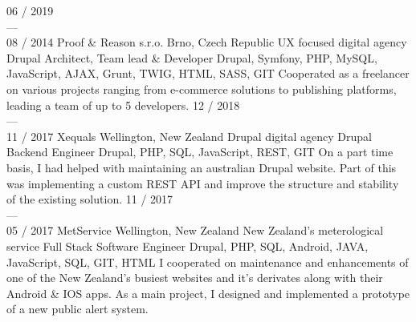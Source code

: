 \documentclass[]{friggeri-cv} %
\begin{document}
    \begin{entrylist}
        \job
        {06 / 2019 \\ --- \\ 08 / 2014}
        {Proof \& Reason s.r.o.}
        {Brno, Czech Republic}
        {UX focused digital agency}
        {
            \position
            {Drupal Architect, Team lead \& Developer}
            {Drupal, Symfony, PHP, MySQL, JavaScript, AJAX, Grunt, TWIG, HTML, SASS, GIT}
            {
                Cooperated as a freelancer on various projects ranging from e-commerce solutions to publishing platforms, leading a team of up to 5 developers.
            }%
        }
        \job
        {12 / 2018 \\ --- \\ 11 / 2017}
        {Xequals}
        {Wellington, New Zealand}
        {Drupal digital agency}
        {
            \position
            {Drupal Backend Engineer}
            {Drupal, PHP, SQL, JavaScript, REST, GIT}
            {
                On a part time basis, I had helped with maintaining an australian Drupal website. Part of this
            was implementing a custom REST API and improve the structure and stability of the existing solution.
            }
        }
        \job
        {11 / 2017 \\ --- \\ 05 / 2017}
        {MetService}
        {Wellington, New Zealand}
        {New Zealand's meterological service}
        {
            \position
            {Full Stack Software Engineer}
            {Drupal, PHP, SQL, Android, JAVA, JavaScript, SQL, GIT, HTML}
            {
                I cooperated on maintenance and enhancements of one of the New Zealand's busiest websites and it's derivates along with their Android \& IOS apps.
                As a main project, I designed and implemented a prototype of a new public alert system.
            }
}
\end{entrylist}
\end{document}
